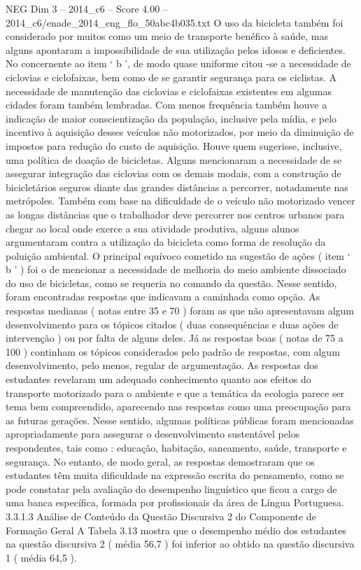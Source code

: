 \begin{textsample}{NEG Dim 3 – 2014\_c6 – Score 4.00 – 2014\_c6/enade\_2014\_eng\_flo\_50abc4b035.txt}
O uso da bicicleta também foi considerado por muitos como um meio de transporte benéfico à saúde, mas alguns apontaram a impossibilidade de sua utilização pelos idosos e deficientes.
No concernente ao item ‘ b ’, de modo quase uniforme citou -se a necessidade de ciclovias e ciclofaixas, bem como de se garantir segurança para os ciclistas.
A necessidade de manutenção das ciclovias e ciclofaixas existentes em algumas cidades foram também lembradas.
Com menos frequência também houve a indicação de maior conscientização da população, inclusive pela mídia, e pelo incentivo à aquisição desses veículos não motorizados, por meio da diminuição de impostos para redução do custo de aquisição.
Houve quem sugerisse, inclusive, uma política de doação de bicicletas.
Alguns mencionaram a necessidade de se assegurar integração das ciclovias com os demais modais, com a construção de bicicletários seguros diante das grandes distâncias a percorrer, notadamente nas metrópoles.
Também com base na dificuldade de o veículo não motorizado vencer as longas distâncias que o trabalhador deve percorrer nos centros urbanos para chegar ao local onde exerce a sua atividade produtiva, alguns alunos argumentaram contra a utilização da bicicleta como forma de resolução da poluição ambiental.
O principal equívoco cometido na sugestão de ações ( item ‘ b ’ ) foi o de mencionar a necessidade de melhoria do meio ambiente dissociado do uso de bicicletas, como se requeria no comando da questão.
Nesse sentido, foram encontradas respostas que indicavam a caminhada como opção.
As respostas medianas ( notas entre 35 e 70 ) foram as que não apresentavam algum desenvolvimento para os tópicos citados ( duas consequências e duas ações de intervenção ) ou por falta de alguns deles.
Já as respostas boas ( notas de 75 a 100 ) continham os tópicos considerados pelo padrão de respostas, com algum desenvolvimento, pelo menos, regular de argumentação.
As respostas dos estudantes revelaram um adequado conhecimento quanto aos efeitos do transporte motorizado para o ambiente e que a temática da ecologia parece ser tema bem compreendido, aparecendo nas respostas como uma preocupação para as futuras gerações.
Nesse sentido, algumas políticas públicas foram mencionadas apropriadamente para assegurar o desenvolvimento sustentável pelos respondentes, tais como : educação, habitação, saneamento, saúde, transporte e segurança.
No entanto, de modo geral, as respostas demostraram que os estudantes têm muita dificuldade na expressão escrita do pensamento, como se pode constatar pela avaliação do desempenho linguístico que ficou a cargo de uma banca específica, formada por profissionais da área de Língua Portuguesa. 3.3.1.3 Análise de Conteúdo da Questão Discursiva 2 do Componente de Formação Geral A Tabela 3.13 mostra que o desempenho médio dos estudantes na questão discursiva 2 ( média 56,7 ) foi inferior ao obtido na questão discursiva 1 ( média 64,5 ).

\end{textsample}
